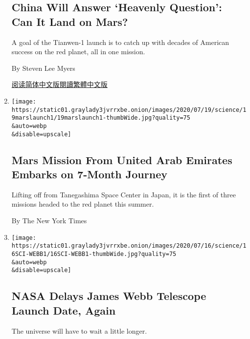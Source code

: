 \begin{enumerate}
  \hypertarget{china-will-answer-heavenly-question-can-it-land-on-mars}{%
  \subsection{China Will Answer `Heavenly Question': Can It Land on
  Mars?}\label{china-will-answer-heavenly-question-can-it-land-on-mars}}

  A goal of the Tianwen-1 launch is to catch up with decades of American
  success on the red planet, all in one mission.

  By Steven Lee Myers

  \href{https://cn.nytimes3xbfgragh.onion/science/20200723/china-mars-mission/}{阅读简体中文版}\href{https://cn.nytimes3xbfgragh.onion/science/20200723/china-mars-mission/zh-hant/}{閱讀繁體中文版}
\item
  \href{/2020/07/19/science/emirates-mars-mission.html}{}

  \texttt{[image: https://static01.graylady3jvrrxbe.onion/images/2020/07/19/science/19marslaunch1/19marslaunch1-thumbWide.jpg?quality=75\\\&auto=webp\\\&disable=upscale]}

  \hypertarget{mars-mission-from-united-arab-emirates-embarks-on-7-month-journey}{%
  \subsection{Mars Mission From United Arab Emirates Embarks on 7-Month
  Journey}\label{mars-mission-from-united-arab-emirates-embarks-on-7-month-journey}}

  Lifting off from Tanegashima Space Center in Japan, it is the first of
  three missions headed to the red planet this summer.

  By The New York Times
\item
  \href{/2020/07/16/science/nasa-james-webb-space-telescope-delay.html}{}

  \texttt{[image: https://static01.graylady3jvrrxbe.onion/images/2020/07/16/science/16SCI-WEBB1/16SCI-WEBB1-thumbWide.jpg?quality=75\\\&auto=webp\\\&disable=upscale]}

  \hypertarget{nasa-delays-james-webb-telescope-launch-date-again}{%
  \subsection{NASA Delays James Webb Telescope Launch Date,
  Again}\label{nasa-delays-james-webb-telescope-launch-date-again}}

  The universe will have to wait a little longer.


\end{enumerate}

